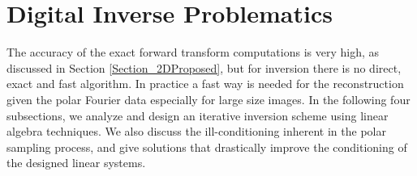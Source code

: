 \documentclass{UCF_ETD}
\begin{document}
 
 \section{Digital Inverse Problematics} \label{Section_Inverse2DProposed}
  The accuracy of the exact forward transform computations { is very high, as discussed in Section \ref{Section_2DProposed}}, but for inversion there is no direct, exact and fast algorithm. In practice a fast way is needed for the reconstruction given the polar Fourier data especially for large size images. In the following four subsections, we analyze and design an iterative inversion scheme using linear algebra techniques. We also discuss the ill-conditioning inherent in the polar sampling process, and give solutions that drastically improve the conditioning of the designed linear systems.
 
\end{document}
